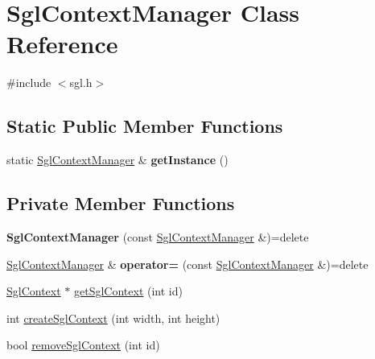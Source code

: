 \hypertarget{class_sgl_context_manager}{}\section{Sgl\+Context\+Manager Class Reference}
\label{class_sgl_context_manager}


{\ttfamily \#include $<$sgl.\+h$>$}

\subsection*{Static Public Member Functions}
\begin{DoxyCompactItemize}
\item 
\hypertarget{class_sgl_context_manager_af0462ad0aef3a92c76811661cfb4abb4}{}static \hyperlink{class_sgl_context_manager}{Sgl\+Context\+Manager} \& {\bfseries get\+Instance} ()\label{class_sgl_context_manager_af0462ad0aef3a92c76811661cfb4abb4}

\end{DoxyCompactItemize}
\subsection*{Private Member Functions}
\begin{DoxyCompactItemize}
\item 
\hypertarget{class_sgl_context_manager_a5aba22f58fd714f2ae028bfc09f02b43}{}{\bfseries Sgl\+Context\+Manager} (const \hyperlink{class_sgl_context_manager}{Sgl\+Context\+Manager} \&)=delete\label{class_sgl_context_manager_a5aba22f58fd714f2ae028bfc09f02b43}

\item 
\hypertarget{class_sgl_context_manager_a19da82729b3eba92d8accd173192882f}{}\hyperlink{class_sgl_context_manager}{Sgl\+Context\+Manager} \& {\bfseries operator=} (const \hyperlink{class_sgl_context_manager}{Sgl\+Context\+Manager} \&)=delete\label{class_sgl_context_manager_a19da82729b3eba92d8accd173192882f}

\item 
\hyperlink{class_sgl_context}{Sgl\+Context} $\ast$ \hyperlink{class_sgl_context_manager_a9295cd40230239d749dbad0d18c3c6d6}{get\+Sgl\+Context} (int id)
\item 
int \hyperlink{class_sgl_context_manager_aa833fcbf948965f1936122aed0d5d765}{create\+Sgl\+Context} (int width, int height)
\item 
bool \hyperlink{class_sgl_context_manager_a7115ec4c729f5890d4579137118528a3}{remove\+Sgl\+Context} (int id)
\end{DoxyCompactItemize}
